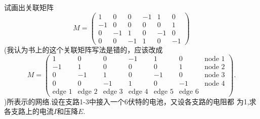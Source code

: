 ﻿\documentclass{book} \usepackage{exsheets} \usepackage{xeCJK}
\begin{document}
\begin{question}
  试画出关联矩阵
$$
M=
\begin{pmatrix}
  1&0&0&-1&1&0\\
  -1&0&0&0&0&1\\
  0&-1&1&0&-1&0\\
  0&0&-1&1&0&-1
\end{pmatrix}
$$(我认为书上的这个关联矩阵写法是错的，应该改成
$$
M=
\begin{pmatrix}
  1&0&0&-1&1&0&\mbox{node 1}\\
  -1&1&0&0&0&1&\mbox{node 2}\\
  0&-1&1&0&-1&0&\mbox{node 3}\\
  0&0&-1&1&0&-1&\mbox{node 4}\\
  \mbox{edge 1}&\mbox{edge 2}&\mbox{edge 3}&\mbox{edge 4}&\mbox{edge
    5}&\mbox{edge 6}
\end{pmatrix}.
$$
)所表示的网络.设在支路1-3中接入一个6伏特的电池，又设各支路的电阻都
为1,求各支路上的电流$I$和压降$E$.
\end{question}
\end{document}
